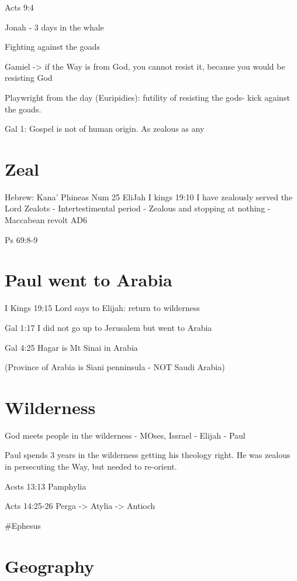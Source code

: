 \documentclass[
]{book}
\begin{document}
Acts 9:4

Jonah - 3 days in the whale

Fighting against the goads

Gamiel -\textgreater{} if the Way is from God, you cannot resist it, because you would be resisting God

Playwright from the day (Euripidies): futility of resisting the gods- kick against the goads.

Gal 1: Gospel is not of human origin. As zealous as any

\hypertarget{zeal}{%
\section{Zeal}\label{zeal}}

Hebrew: Kana'
Phineas
Num 25
EliJah
I kings 19:10 I have zealously served the Lord
Zealots - Intertestimental period
- Zealous and stopping at nothing
- Maccabean revolt AD6

Ps 69:8-9

\hypertarget{paul-went-to-arabia}{%
\section{Paul went to Arabia}\label{paul-went-to-arabia}}

I Kings 19:15 Lord says to Elijah: return to wilderness

Gal 1:17 I did not go up to Jerusalem but went to Arabia

Gal 4:25 Hagar is Mt Sinai in Arabia

(Province of Arabia is Siani penninsula - NOT Saudi Arabia)

\hypertarget{wilderness}{%
\section{Wilderness}\label{wilderness}}

God meets people in the wilderness - MOses, Issrael - Elijah - Paul

Paul spends 3 years in the wilderness getting his theology right. He was zealous in persecuting the Way, but needed to re-orient.

Acsts 13:13 Pamphylia

Acts 14:25-26 Perga -\textgreater{} Atylia -\textgreater{} Antioch

\#Ephesus

\hypertarget{geography}{%
\section{Geography}\label{geography}}
\end{document}
